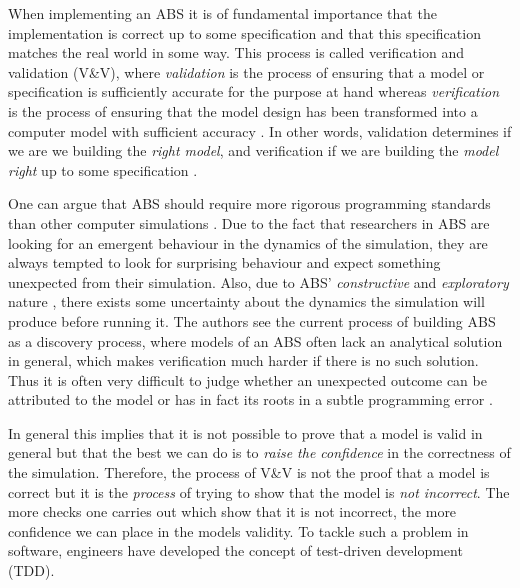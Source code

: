 \label{ch:property}

When implementing an ABS it is of fundamental importance that the implementation is correct up to some specification and that this specification matches the real world in some way. This process is called verification and validation (V\&V), where \textit{validation} is the process of ensuring that a model or specification is sufficiently accurate for the purpose at hand whereas \textit{verification} is the process of ensuring that the model design has been transformed into a computer model with sufficient accuracy \cite{robinson_simulation:_2014}. In other words, validation determines if we are we building the \textit{right model}, and verification if we are building the \textit{model right} up to some specification \cite{balci_verification_1998}.

One can argue that ABS should require more rigorous programming standards than other computer simulations \cite{polhill_ghost_2005}. Due to the fact that researchers in ABS are looking for an emergent behaviour in the dynamics of the simulation, they are always tempted to look for surprising behaviour and expect something unexpected from their simulation. 
Also, due to ABS' \textit{constructive} and \textit{exploratory} nature \cite{epstein_chapter_2006, epstein_generative_2012}, there exists some uncertainty about the dynamics the simulation will produce before running it. The authors \cite{ormerod_validation_2006} see the current process of building ABS as a discovery process, where models of an ABS often lack an analytical solution in general, which makes verification much harder if there is no such solution. Thus it is often very difficult to judge whether an unexpected outcome can be attributed to the model or has in fact its roots in a subtle programming error \cite{galan_errors_2009}.

In general this implies that it is not possible to prove that a model is valid in general but that the best we can do is to \textit{raise the confidence} in the correctness of the simulation. Therefore, the process of V\&V is not the proof that a model is correct but it is the \textit{process} of trying to show that the model is \textit{not incorrect}. The more checks one carries out which show that it is not incorrect, the more confidence we can place in the models validity. To tackle such a problem in software, engineers have developed the concept of test-driven development (TDD).

